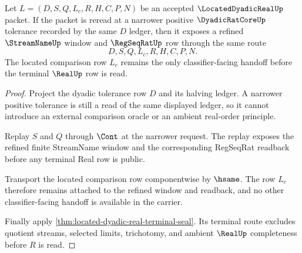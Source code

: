 \begin{theorem}
\label{thm:located-dyadic-real-comparison-refinement}
Let $L=(D,S,Q,L_c,R,H,C,P,N)$ be an accepted $\LocatedDyadicRealUp$ packet. If the packet is reread at a narrower positive $\DyadicRatCoreUp$ tolerance recorded by the same $D$ ledger, then it exposes a refined $\StreamNameUp$ window and $\RegSeqRatUp$ row through the same route
$$
D,S,Q,L_c,R,H,C,P,N .
$$
The located comparison row $L_c$ remains the only classifier-facing handoff before the terminal $\RealUp$ row is read.
\end{theorem}
\begin{proof}
Project the dyadic tolerance row $D$ and its halving ledger. A narrower positive tolerance is still a read of the same displayed ledger, so it cannot introduce an external comparison oracle or an ambient real-order principle.

Replay $S$ and $Q$ through $\Cont$ at the narrower request. The replay exposes the refined finite StreamName window and the corresponding RegSeqRat readback before any terminal Real row is public.

Transport the located comparison row componentwise by $\hsame$. The row $L_c$ therefore remains attached to the refined window and readback, and no other classifier-facing handoff is available in the carrier.

Finally apply \autoref{thm:located-dyadic-real-terminal-seal}. Its terminal route excludes quotient streams, selected limits, trichotomy, and ambient $\RealUp$ completeness before $R$ is read.
\end{proof}





